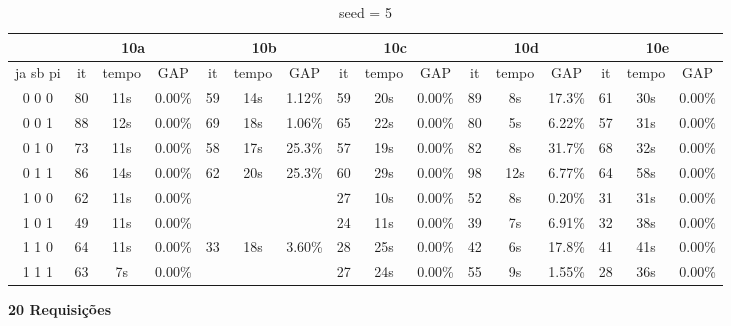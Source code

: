 \documentclass[12pt]{article}
\begin{document}
\begin{table}[!htb]
\centering
\footnotesize
\begin{tabular}{|c||c|c|c||c|c|c||c|c|c||c|c|c||c|c|c|}
\cline{2-16}
\multicolumn{1}{c||}{} & \multicolumn{3}{c||}{10a} & \multicolumn{3}{c||}{10b} & \multicolumn{3}{c||}{10c} & \multicolumn{3}{c||}{10d} & \multicolumn{3}{c|}{10e}\\
\hline
ja sb pi & it & tempo & GAP & it & tempo & GAP & it & tempo & GAP & it & tempo & GAP & it & tempo & GAP \\
\hline
0 0 0 & 80 & 11s & 0.00\% & 59 & 14s & 1.12\% & 59 & 20s & 0.00\% & 89 & 8s & 17.3\% & 61 & 30s & 0.00\%\\
0 0 1 & 88 & 12s & 0.00\% & 69 & 18s & 1.06\% & 65 & 22s & 0.00\% & 80 & 5s & 6.22\% & 57 & 31s & 0.00\%\\
0 1 0 & 73 & 11s & 0.00\% & 58 & 17s & 25.3\% & 57 & 19s & 0.00\% & 82 & 8s & 31.7\% & 68 & 32s & 0.00\%\\
0 1 1 & 86 & 14s & 0.00\% & 62 & 20s & 25.3\% & 60 & 29s & 0.00\% & 98 & 12s & 6.77\% & 64 & 58s & 0.00\%\\
1 0 0 & 62 & 11s & 0.00\% &  &  &             & 27 & 10s & 0.00\% & 52 & 8s & 0.20\% & 31 & 31s & 0.00\%\\
1 0 1 & 49 & 11s & 0.00\% &  &  &             & 24 & 11s & 0.00\% & 39 & 7s & 6.91\% & 32 & 38s & 0.00\%\\
1 1 0 & 64 & 11s & 0.00\% & 33 & 18s & 3.60\% & 28 & 25s & 0.00\% & 42 & 6s & 17.8\% & 41 & 41s & 0.00\%\\
1 1 1 & 63 & 7s & 0.00\% &  &  &              & 27 & 24s & 0.00\% & 55 & 9s & 1.55\% & 28 & 36s & 0.00\% \\
\hline
\end{tabular}
\caption{seed = 5}
\end{table}


\vspace{8cm}

\begin{center}
\textbf{20 Requisi\c{c}\~oes}
\end{center}
\end{document}
